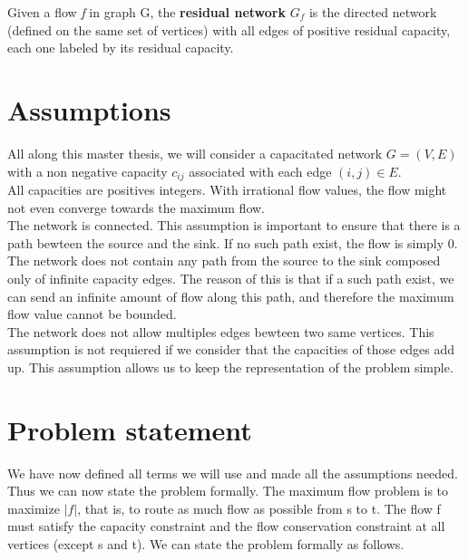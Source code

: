 \begin{definition}
\label{rnetwork}
Given a flow \textit{f} in graph G, the \textbf{residual network} $G_f$ is the directed network (defined on the same set of vertices) with all edges of positive residual capacity, each one labeled by its residual capacity.
\end{definition}


\section{Assumptions}

All along this master thesis, we will  consider a capacitated network $G = (V, E)$ with a non negative  capacity $c_{ij}$ associated with each edge $(i, j) \in E$.\\

All capacities are positives integers. With irrational flow values, the flow might not even converge towards the maximum flow.\\

The network is connected. This assumption is important to ensure that there is a path bewteen the source and the sink. If no such path exist, the flow is simply $0$.\\

The network does not contain any path from the source to the sink composed only of infinite capacity edges. The reason of this is that if a such path exist, we can send an infinite amount of flow along this path, and therefore the maximum flow value cannot be bounded. \\

The network does not allow multiples edges bewteen two same vertices. This assumption is not requiered if we consider that the capacities of those edges add up. This assumption allows us to keep the representation of the problem simple.

\section{Problem statement}

We have now defined all terms we will use and made all the assumptions needed. Thus we can now state the problem formally. The maximum flow problem is to maximize $\left\vert{f}\right\vert$, that is, to route as much flow as possible from s to t. The flow f must satisfy the capacity constraint and the flow conservation constraint at all vertices (except s and t). We can state the problem formally as follows.

